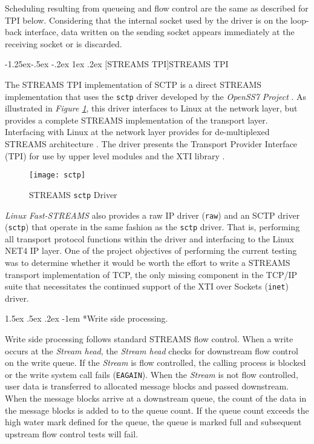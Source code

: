 \documentclass[letterpaper,final,notitlepage,twocolumn,10pt,twoside]{article}
\makeatletter
\renewcommand\subsubsection{\@startsection{subsubsection}{3}{\z@}%
                                     {-1.25ex\@plus -.5ex \@minus -.2ex}%
                                     {1ex \@plus .2ex}%
                                     {\normalfont\normalsize\bfseries}}
\renewcommand\paragraph{\@startsection{paragraph}{4}{\z@}%
                                    {1.5ex \@plus .5ex \@minus .2ex}%
                                    {-1em}%
                                    {\normalfont\normalsize\bfseries\slshape}}
\makeatother
\begin{document}
Scheduling resulting from queueing and flow control are the same as described for TPI below.
Considering that the internal socket used by the driver is on the loop-back interface, data written
on the sending socket appears immediately at the receiving socket or is discarded.

\subsubsection[STREAMS TPI]{STREAMS TPI}
\label{section:tpisctp}

The STREAMS TPI implementation of SCTP is a direct STREAMS implementation that uses the
\texttt{sctp} driver developed by the \textsl{OpenSS7 Project} \cite[]{openss7}.  As illustrated in
\textit{Figure \ref{figure:sctp}}, this driver interfaces to Linux at the network layer, but
provides a complete STREAMS implementation of the transport layer.  Interfacing with Linux at the
network layer provides for de-multiplexed STREAMS architecture \cite[]{demux}.  The driver presents
the Transport Provider Interface (TPI) \cite[]{tpi} for use by upper level modules and the XTI
library \cite[]{xti}.

\begin{figure}[htp]
\center\texttt{[image: sctp]}
\caption[STREAMS \texttt{sctp} Driver]{STREAMS \texttt{sctp} Driver}
\label{figure:sctp}
\end{figure}

\textsl{Linux Fast-STREAMS} also provides a raw IP driver (\texttt{raw}) and an SCTP driver
(\texttt{sctp}) that operate in the same fashion as the \texttt{sctp} driver.  That is, performing
all transport protocol functions within the driver and interfacing to the Linux NET4 IP layer.  One
of the project objectives of performing the current testing was to determine whether it would be
worth the effort to write a STREAMS transport implementation of TCP, the only missing component in
the TCP/IP suite that necessitates the continued support of the XTI over Sockets (\texttt{inet})
driver.

\paragraph*{Write side processing.}

Write side processing follows standard STREAMS flow control.  When a write occurs at the
\textit{Stream head}, the \textit{Stream head} checks for downstream flow control on the write
queue.  If the \textit{Stream} is flow controlled, the calling process is blocked or the write
system call fails (\texttt{EAGAIN}).  When the \textit{Stream} is not flow controlled, user data is
transferred to allocated message blocks and passed downstream.  When the message blocks arrive at a
downstream queue, the count of the data in the message blocks is added to to the queue count.  If
the queue count exceeds the high water mark defined for the queue, the queue is marked full and
subsequent upstream flow control tests will fail.
\end{document}
